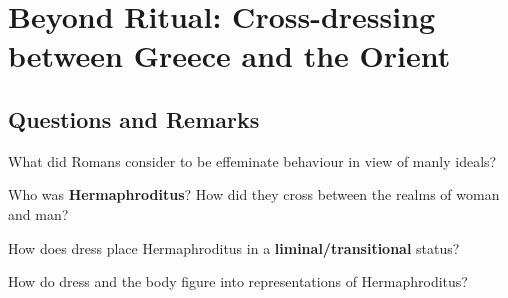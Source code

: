 %
%
%
\chapter{Beyond Ritual: Cross-dressing between Greece and the Orient}
\label{BeyondRitual} %








\abstract{}

\section{Questions and Remarks}
\label{sec:QR11}

\begin{qst}
    What did Romans consider to be effeminate behaviour in view of manly ideals?
\end{qst}


\begin{qst}
    Who was \textbf{Hermaphroditus}? How did they cross between the realms of woman and man?
\end{qst}


\begin{qst}
    How does dress place Hermaphroditus in a \textbf{liminal/transitional} status?
\end{qst}

\begin{qst}
    How do dress and the body figure into representations of Hermaphroditus?
\end{qst}


